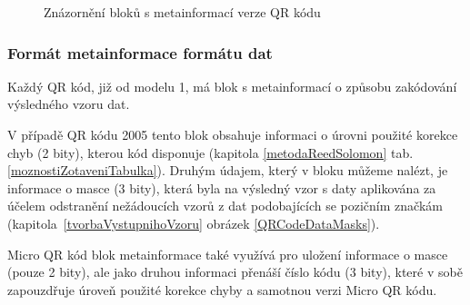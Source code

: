 \begin{figure}[H]
  \begin{center}
    \caption{Znázornění bloků s metainformací verze QR kódu}
    \label{QRCodeVersionMetainformation}
  \end{center}
\end{figure}

\subsubsection{Formát metainformace formátu dat}
\label{metainfoFormatEncoding}

Každý QR kód, již od modelu 1, má blok s metainformací o způsobu zakódování
výsledného vzoru dat. 

V případě QR kódu 2005 tento blok obsahuje informaci o 
úrovni použité korekce chyb (2 bity), kterou kód disponuje (kapitola 
\ref{metodaReedSolomon} tab. \ref{moznostiZotaveniTabulka}). Druhým údajem,
který v bloku můžeme nalézt, je informace o masce (3 bity), která byla na
výsledný vzor s daty aplikována za účelem odstranění nežádoucích vzorů z dat
podobajících se pozičním značkám (kapitola~\ref{tvorbaVystupnihoVzoru} obrázek
\ref{QRCodeDataMasks}).

Micro QR kód blok metainformace také využívá 
pro uložení informace o masce (pouze 2 bity), ale jako druhou informaci přenáší 
číslo kódu (3 bity), které v sobě zapouzdřuje úroveň použité korekce chyby a 
samotnou verzi Micro QR kódu.

